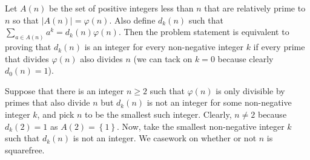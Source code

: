 Let $A\left(n\right)$ be the set of positive integers less than $n$ that are relatively prime to $n$ so that $\left|A\left(n\right)\right|=\varphi\left(n\right)$. Also define $d_k\left(n\right)$ such that $\displaystyle\sum_{a\in A\left(n\right)}a^k=d_k\left(n\right)\varphi\left(n\right)$. Then the problem statement is equivalent to proving that $d_k\left(n\right)$ is an integer for every non-negative integer $k$ if every prime that divides $\varphi\left(n\right)$ also divides $n$ (we can tack on $k=0$ because clearly $d_0\left(n\right)=1$).

Suppose that there is an integer $n\geq2$ such that $\varphi\left(n\right)$ is only divisible by primes that also divide $n$ but $d_k\left(n\right)$ is not an integer for some non-negative integer $k$, and pick $n$ to be the smallest such integer. Clearly, $n\neq2$ because $d_k\left(2\right)=1$ as $A\left(2\right)=\left\{1\right\}$. Now, take the smallest non-negative integer $k$ such that $d_k\left(n\right)$ is not an integer. We casework on whether or not $n$ is squarefree.

